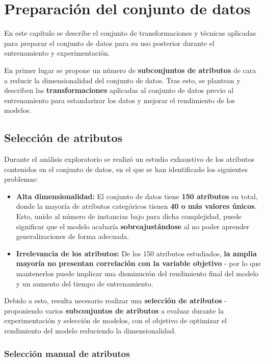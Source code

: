 \chapter{Preparación del conjunto de datos}

En este capítulo se describe el conjunto de transformaciones y técnicas aplicadas para preparar el conjunto de datos para su uso posterior durante el entrenamiento y experimentación.

En primer lugar se propone un número de \textbf{subconjuntos de atributos} de cara a reducir la dimensionalidad del conjunto de datos. Tras esto, se plantean y describen las \textbf{transformaciones} aplicadas al conjunto de datos previo al entrenamiento para estandarizar los datos y mejorar el rendimiento de los modelos.


\section{Selección de atributos}

Durante el análisis exploratorio se realizó un estudio exhaustivo de los atributos contenidos en el conjunto de datos, en el que se han identificado los siguientes problemas:

\begin{itemize}
	\item \textbf{Alta dimensionalidad:} El conjunto de datos tiene \textbf{150 atributos} en total, donde la mayoría de atributos categóricos tienen \textbf{40 o más valores únicos}. Esto, unido al número de instancias bajo para dicha complejidad, puede significar que el modelo acabaría \textbf{sobreajustándose} al no poder aprender generalizaciones de forma adecuada.
	\item \textbf{Irrelevancia de los atributos:} De los 150 atributos estudiados, \textbf{la amplia mayoría no presentan correlación con la variable objetivo} - por lo que mantenerlos puede implicar una disminución del rendimiento final del modelo y un aumento del tiempo de entrenamiento.
\end{itemize}

Debido a esto, resulta necesario realizar una \textbf{selección de atributos} - proponiendo varios \textbf{subconjuntos de atributos} a evaluar durante la experimentación y selección de modelos, con el objetivo de optimizar el rendimiento del modelo reduciendo la dimensionalidad.

\subsection{Selección manual de atributos}

